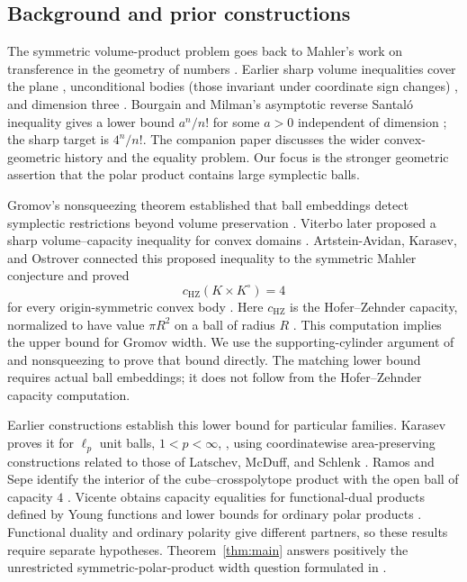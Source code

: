 \subsection*{Background and prior constructions}

The symmetric volume-product problem goes back to Mahler's work on
transference in the geometry of numbers \cite{Mahler1939}.
Earlier sharp volume inequalities cover the plane
\cite[Theorem~13]{BoroczkyMakaiMeyerReisner2013}, unconditional bodies
(those invariant under coordinate sign changes)
\cite[Sections~1--2]{Reisner1987}, and dimension three
\cite{IriyehShibata}. Bourgain and Milman's asymptotic reverse
Santal\'o inequality gives a lower bound $a^n/n!$ for some $a>0$
independent of dimension \cite{BourgainMilman}; the sharp target is
$4^n/n!$. The companion paper \cite{SymmetricCompanion2026} discusses
the wider convex-geometric history and the equality problem. Our focus
is the stronger geometric assertion that the polar product contains
large symplectic balls.

Gromov's nonsqueezing theorem established that ball embeddings detect
symplectic restrictions beyond volume preservation \cite{Gromov1985}.
Viterbo later proposed a sharp volume--capacity inequality for convex
domains \cite{Viterbo2000}. Artstein-Avidan, Karasev, and Ostrover
connected this proposed inequality to the symmetric Mahler conjecture
and proved
\[
 c_{\mathrm{HZ}}(K\times K^\circ)=4
\]
for every origin-symmetric convex body
\cite[Theorems~1.6--1.7 and Section~4]{AAKO2014}.
Here $c_{\mathrm{HZ}}$ is the Hofer--Zehnder capacity, normalized to
have value $\pi R^2$ on a ball of radius $R$
\cite{HoferZehnder1994}. This computation implies the upper bound for
Gromov width. We use the supporting-cylinder argument of
\cite[Remark~4.2]{AAKO2014} and nonsqueezing to prove that bound directly.
The matching lower bound requires actual ball embeddings; it does not
follow from the Hofer--Zehnder capacity computation.

Earlier constructions establish this lower bound for particular
families. Karasev proves it for $\ell_p$ unit balls, $1<p<\infty$,
\cite[Proposition~3.1]{Karasev2021}, using coordinatewise area-preserving
constructions related to those of Latschev, McDuff, and Schlenk
\cite{LatschevMcDuffSchlenk2013}. Ramos and Sepe identify the interior of
the cube--crosspolytope product with the open ball of capacity $4$
\cite[Theorem~7]{RamosSepe2019}. Vicente obtains capacity equalities
for functional-dual products defined by Young functions and lower
bounds for ordinary polar products
\cite[Theorems~1.3 and~1.5]{Vicente2025}.
Functional duality and ordinary polarity give different partners, so
these results require separate hypotheses. Theorem~\ref{thm:main}
answers positively the unrestricted symmetric-polar-product width
question formulated in \cite{VicenteQuestion2026}.

